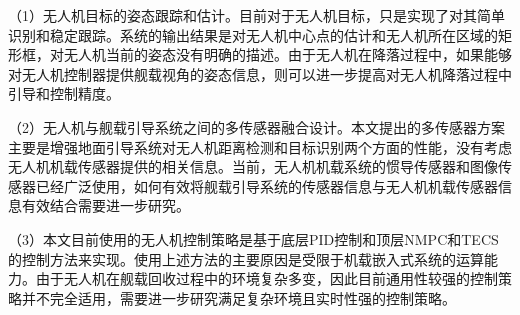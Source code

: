 （1）无人机目标的姿态跟踪和估计。目前对于无人机目标，只是实现了对其简单识别和稳定跟踪。系统的输出结果是对无人机中心点的估计和无人机所在区域的矩形框，对无人机当前的姿态没有明确的描述。由于无人机在降落过程中，如果能够对无人机控制器提供舰载视角的姿态信息，则可以进一步提高对无人机降落过程中引导和控制精度。

（2）无人机与舰载引导系统之间的多传感器融合设计。本文提出的多传感器方案主要是增强地面引导系统对无人机距离检测和目标识别两个方面的性能，没有考虑无人机机载传感器提供的相关信息。当前，无人机机载系统的惯导传感器和图像传感器已经广泛使用，如何有效将舰载引导系统的传感器信息与无人机机载传感器信息有效结合需要进一步研究。

（3）本文目前使用的无人机控制策略是基于底层PID控制和顶层NMPC和TECS的控制方法来实现。使用上述方法的主要原因是受限于机载嵌入式系统的运算能力。由于无人机在舰载回收过程中的环境复杂多变，因此目前通用性较强的控制策略并不完全适用，需要进一步研究满足复杂环境且实时性强的控制策略。